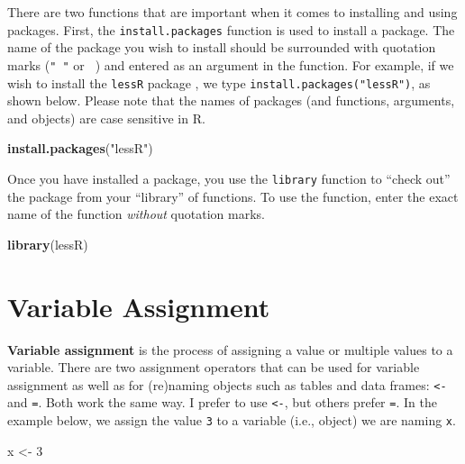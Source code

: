 \documentclass[]{book}
\newenvironment{Shaded}{\begin{snugshade}}{\end{snugshade}}
\newcommand{\KeywordTok}[1]{\textcolor[rgb]{0.13,0.29,0.53}{\textbf{#1}}}
\newcommand{\DecValTok}[1]{\textcolor[rgb]{0.00,0.00,0.81}{#1}}
\newcommand{\StringTok}[1]{\textcolor[rgb]{0.31,0.60,0.02}{#1}}
\newcommand{\NormalTok}[1]{#1}
\begin{document}
There are two functions that are important when it comes to installing
and using packages. First, the \texttt{install.packages} function is
used to install a package. The name of the package you wish to install
should be surrounded with quotation marks (\texttt{"\ "} or
\texttt{\textquotesingle{}\ \textquotesingle{}}) and entered as an
argument in the function. For example, if we wish to install the
\texttt{lessR} package \citep{R-lessR2020}, we type
\texttt{install.packages("lessR")}, as shown below. Please note that the
names of packages (and functions, arguments, and objects) are case
sensitive in R.

\begin{Shaded}
\begin{Highlighting}[]
\KeywordTok{install.packages}\NormalTok{(}\StringTok{"lessR"}\NormalTok{)}
\end{Highlighting}
\end{Shaded}

Once you have installed a package, you use the \texttt{library} function
to ``check out'' the package from your ``library'' of functions. To use
the function, enter the exact name of the function \emph{without}
quotation marks.

\begin{Shaded}
\begin{Highlighting}[]
\KeywordTok{library}\NormalTok{(lessR)}
\end{Highlighting}
\end{Shaded}

\section{Variable Assignment}\label{variable-assignment}

\textbf{Variable assignment} is the process of assigning a value or
multiple values to a variable. There are two assignment operators that
can be used for variable assignment as well as for (re)naming objects
such as tables and data frames: \texttt{\textless{}-} and \texttt{=}.
Both work the same way. I prefer to use \texttt{\textless{}-}, but
others prefer \texttt{=}. In the example below, we assign the value
\texttt{3} to a variable (i.e., object) we are naming \texttt{x}.

\begin{Shaded}
\begin{Highlighting}[]
\NormalTok{x <-}\StringTok{ }\DecValTok{3}
\end{Highlighting}
\end{Shaded}
\end{document}
